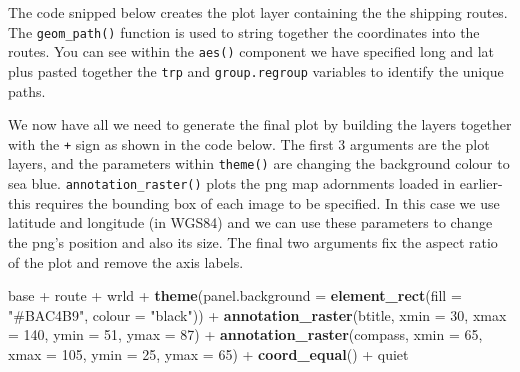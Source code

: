 \documentclass[]{article}
\newenvironment{Shaded}{}{}
\newcommand{\KeywordTok}[1]{\textcolor[rgb]{0.00,0.44,0.13}{\textbf{{#1}}}}
\newcommand{\DataTypeTok}[1]{\textcolor[rgb]{0.56,0.13,0.00}{{#1}}}
\newcommand{\DecValTok}[1]{\textcolor[rgb]{0.25,0.63,0.44}{{#1}}}
\newcommand{\FloatTok}[1]{\textcolor[rgb]{0.25,0.63,0.44}{{#1}}}
\newcommand{\StringTok}[1]{\textcolor[rgb]{0.25,0.44,0.63}{{#1}}}
\newcommand{\NormalTok}[1]{{#1}}
\begin{document}
The code snipped below creates the plot layer containing the the
shipping routes. The \texttt{geom\_path()} function is used to string
together the coordinates into the routes. You can see within the
\texttt{aes()} component we have specified long and lat plus pasted
together the \texttt{trp} and \texttt{group.regroup} variables to
identify the unique paths.

\begin{Shaded}
\end{Shaded}

We now have all we need to generate the final plot by building the
layers together with the \texttt{+} sign as shown in the code below. The
first 3 arguments are the plot layers, and the parameters within
\texttt{theme()} are changing the background colour to sea blue.
\texttt{annotation\_raster()} plots the png map adornments loaded in
earlier- this requires the bounding box of each image to be specified.
In this case we use latitude and longitude (in WGS84) and we can use
these parameters to change the png's position and also its size. The
final two arguments fix the aspect ratio of the plot and remove the axis
labels.

\begin{Shaded}
\begin{Highlighting}[]
\NormalTok{base + route + wrld + }\KeywordTok{theme}\NormalTok{(}\DataTypeTok{panel.background =} \KeywordTok{element_rect}\NormalTok{(}\DataTypeTok{fill =} \StringTok{"#BAC4B9"}\NormalTok{, }
    \DataTypeTok{colour =} \StringTok{"black"}\NormalTok{)) + }\KeywordTok{annotation_raster}\NormalTok{(btitle, }\DataTypeTok{xmin =} \DecValTok{30}\NormalTok{, }\DataTypeTok{xmax =} \DecValTok{140}\NormalTok{, }\DataTypeTok{ymin =} \DecValTok{51}\NormalTok{, }
    \DataTypeTok{ymax =} \DecValTok{87}\NormalTok{) + }\KeywordTok{annotation_raster}\NormalTok{(compass, }\DataTypeTok{xmin =} \DecValTok{65}\NormalTok{, }\DataTypeTok{xmax =} \DecValTok{105}\NormalTok{, }\DataTypeTok{ymin =} \DecValTok{25}\NormalTok{, }
    \DataTypeTok{ymax =} \DecValTok{65}\NormalTok{) + }\KeywordTok{coord_equal}\NormalTok{() + quiet}
\end{Highlighting}
\end{Shaded}
\end{document}
